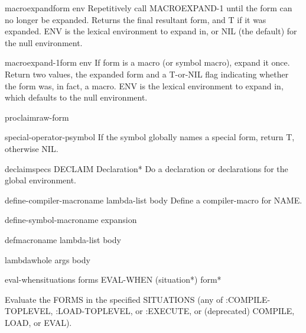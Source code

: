 \begin{function}{macroexpand}{form \op env}
  Repetitively call MACROEXPAND-1 until the form can no longer be expanded.
   Returns the final resultant form, and T if it was expanded. ENV is the
   lexical environment to expand in, or NIL (the default) for the null
   environment.
\end{function}

\begin{function}{macroexpand-1}{form \op env}
  If form is a macro (or symbol macro), expand it once. Return two values,
   the expanded form and a T-or-NIL flag indicating whether the form was, in
   fact, a macro. ENV is the lexical environment to expand in, which defaults
   to the null environment.
\end{function}

\begin{function}{proclaim}{raw-form}
  
\end{function}

\begin{function}{special-operator-p}{symbol}
  If the symbol globally names a special form, return T, otherwise NIL.
\end{function}

\begin{macro}{declaim}{\rest specs}
  DECLAIM Declaration*
  Do a declaration or declarations for the global environment.
\end{macro}

\begin{macro}{define-compiler-macro}{name lambda-list \body body}
  Define a compiler-macro for NAME.
\end{macro}

\begin{macro}{define-symbol-macro}{name expansion}
  
\end{macro}

\begin{macro}{defmacro}{name lambda-list \rest body}
  
\end{macro}

\begin{macro}{lambda}{\whole whole args \body body}
  
\end{macro}

\begin{specialop}{eval-when}{situations \rest forms}
  EVAL-WHEN (situation*) form*

Evaluate the FORMS in the specified SITUATIONS (any of :COMPILE-TOPLEVEL,
:LOAD-TOPLEVEL, or :EXECUTE, or (deprecated) COMPILE, LOAD, or EVAL).
\end{specialop}

